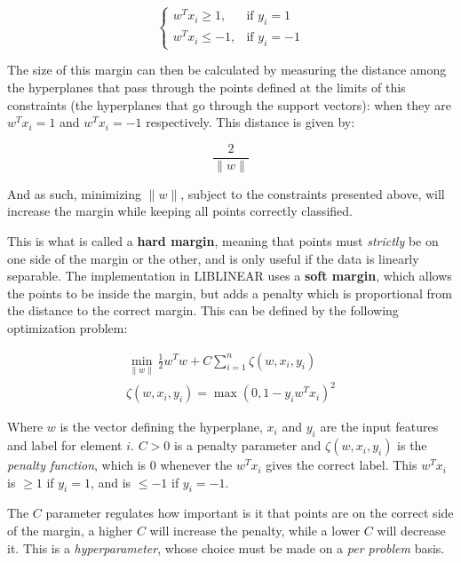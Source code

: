 \documentclass[epsfig,a4paper,11pt,titlepage,twoside,openany]{book}
\begin{document}
\begin{equation*}
    \begin{cases}
            w^T x_i \geq 1, & \text{if } y_i = 1 \\
            w^T x_i \leq -1, & \text{if } y_i = -1
    \end{cases} 
\end{equation*}

The size of this margin can then be calculated by measuring the distance among the hyperplanes that pass through the points defined at the limits of this constraints (the hyperplanes that go through the support vectors): when they are $w^T x_i = 1$ and $w^T x_i  = -1$ respectively. This distance is given by:

\begin{equation*}
    \frac{2}{\|w\|}
\end{equation*}

And as such, minimizing $\|w\|$, subject to the constraints presented above, will increase the margin while keeping all points correctly classified. 

This is what is called a \textbf{hard margin}, meaning that points must \textit{strictly} be on one side of the margin or the other, and is only useful if the data is linearly separable. The implementation in LIBLINEAR \cite{Fan:2008_liblinear} uses a \textbf{soft margin}, which allows the points to be inside the margin, but adds a penalty which is proportional from the distance to the correct margin. This can be defined by the following optimization problem:

\begin{align*}
    \min_{\|w\|} \frac{1}{2} w^T w + C \sum_{i=1}^n \zeta(w, x_i, y_i) \\ 
    \zeta(w, x_i, y_i) = \max(0, 1-y_i w^T x_i)^2
\end{align*}

Where $w$ is the vector defining the hyperplane, $x_i$ and $y_i$ are the input features and label for element $i$. $C > 0$ is a penalty parameter and $\zeta(w, x_i, y_i)$ is the \textit{penalty function}, which is 0 whenever the $w^T x_i$ gives the correct label. This $w^T x_i$ is $\geq 1$ if $y_i = 1$, and is $\leq -1$ if $y_i = -1$. 

The $C$ parameter regulates how important is it that points are on the correct side of the margin, a higher $C$ will increase the penalty, while a lower $C$ will decrease it. This is a \textit{hyperparameter}, whose choice must be made on a \textit{per problem} basis. 
\end{document}
